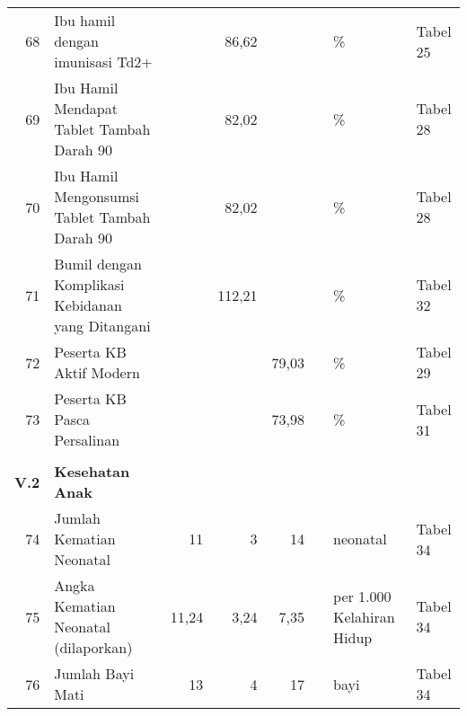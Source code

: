 \begin{small}
\begin{longtable}{rY{12em}rrrrY{5em}Y{5em}}
	                   68 & Ibu hamil dengan imunisasi Td2+                                                       &        &  86,62 &         &                   & \%                             & Tabel 25 \\
	 69 & Ibu Hamil Mendapat Tablet Tambah Darah 90                                             &        &  82,02 &         &                   & \%                             & Tabel 28 \\
	                   70 & Ibu Hamil Mengonsumsi Tablet Tambah Darah 90                                          &        &  82,02 &         &                   & \%                             & Tabel 28 \\
	 71 & Bumil dengan Komplikasi Kebidanan yang Ditangani                                      &        & 112,21 &         &                   & \%                             & Tabel 32 \\
	                   72 & Peserta KB Aktif Modern                                                               &        &        &   79,03 &                   & \%                             & Tabel 29 \\
	 73 & Peserta KB Pasca Persalinan                                                           &        &        &   73,98 &                   & \%                             & Tabel 31 \\
	                      &                                                                                       &        &        &         &                   &                                &          \\
	         \textbf{V.2} & \textbf{Kesehatan Anak}                                                               &        &        &         &                   &                                &          \\
	                   74 & Jumlah Kematian Neonatal                                                              &     11 &      3 &      14 &                   & neonatal                       & Tabel 34 \\
	 75 & Angka Kematian Neonatal (dilaporkan)                                                  &  11,24 &   3,24 &    7,35 &                   & per 1.000 Kelahiran Hidup      & Tabel 34 \\
	                   76 & Jumlah Bayi Mati                                                                      &     13 &      4 &      17 &                   & bayi                           & Tabel 34 \\

\end{longtable}
\end{small}
